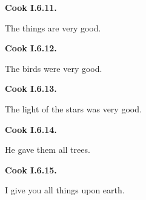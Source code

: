 \par\begin{minipage}{\linewidth}\raggedright
\textbf{Cook I.6.11.}

The things are very good.

\end{minipage}\par\addvspace{4pt}

\par\begin{minipage}{\linewidth}\raggedright
\textbf{Cook I.6.12.}

The birds were very good.

\end{minipage}\par\addvspace{4pt}

\par\begin{minipage}{\linewidth}\raggedright
\textbf{Cook I.6.13.}

The light of the stars was very good.

\end{minipage}\par\addvspace{4pt}

\par\begin{minipage}{\linewidth}\raggedright
\textbf{Cook I.6.14.}

He gave them all trees.

\end{minipage}\par\addvspace{4pt}

\par\begin{minipage}{\linewidth}\raggedright
\textbf{Cook I.6.15.}

I give you all things upon earth.

\end{minipage}\par\addvspace{4pt}

